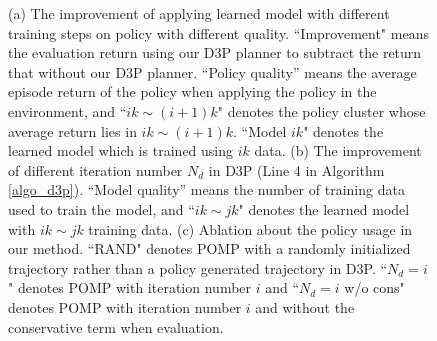\documentclass{article} %
\newcommand{\yue}[1]{ {#1}}
\begin{document}
\begin{figure}
    \centering
    \begin{minipage}{0.32\linewidth}
    \end{minipage}
    \begin{minipage}{0.32\linewidth}
    \end{minipage}
        \begin{minipage}{0.32\linewidth}
    \end{minipage}
    \caption{{ (a) The improvement of applying learned model with different training steps on policy with different quality. \yue{``Improvement" means the evaluation return using our D3P planner to subtract the return that without our D3P planner.  ``Policy quality” means the average episode return of the policy when applying the policy in the environment, and ``$ik{\sim}(i+1)k$" denotes the policy cluster whose average return lies in $ik{\sim}(i+1)k$. } ``Model $ik$" denotes the learned model which is trained using $ik$ data. (b) The improvement of different iteration number $N_d$ in D3P (Line 4 in Algorithm \ref{algo_d3p}). \yue{``Model quality” means the number of training data used to train the model, and ``$ik{\sim}jk$" denotes the learned model with  $ik{\sim}jk$ training data.} (c) Ablation  about the policy usage in our method. ``RAND" denotes POMP with a randomly initialized trajectory rather than a policy generated trajectory in D3P. ``$N_d=i$" denotes POMP with iteration number $i$ and ``$N_d=i$ w/o cons" denotes POMP with iteration number $i$  and without the conservative term when evaluation. }} 
    \label{fig:abquality}
\end{figure}
\end{document}
